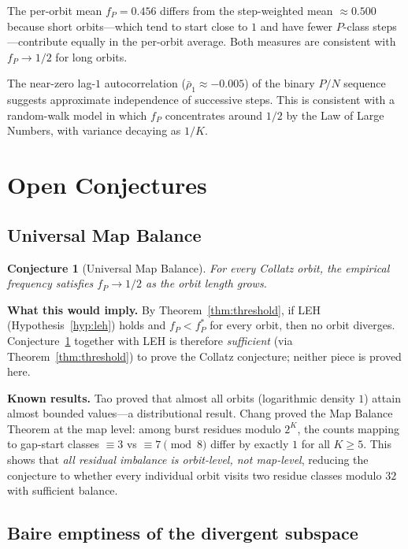 \documentclass[12pt,reqno]{amsart}
\theoremstyle{plain}
\newtheorem{conjecture}[theorem]{Conjecture}
\theoremstyle{definition}
\newcommand{\fP}{f_P}
\newcommand{\fPstar}{f_P^*}
\begin{document}
The per-orbit mean $\fP = 0.456$ differs from the step-weighted mean
$\approx 0.500$ because short orbits---which tend to start close to $1$ and
have fewer $P$-class steps---contribute equally in the per-orbit average.
Both measures are consistent with $\fP \to 1/2$ for long orbits.

The near-zero lag-$1$ autocorrelation ($\bar{\rho}_1 \approx -0.005$) of the
binary $P/N$ sequence suggests approximate independence of successive steps.
This is consistent with a random-walk model in which $\fP$ concentrates
around $1/2$ by the Law of Large Numbers, with variance decaying as $1/K$.

\section{Open Conjectures}\label{sec:conjectures}

\subsection{Universal Map Balance}

\begin{conjecture}[Universal Map Balance]\label{conj:balance}
For every Collatz orbit, the empirical frequency satisfies $\fP \to 1/2$
as the orbit length grows.
\end{conjecture}

\textbf{What this would imply.} By Theorem~\ref{thm:threshold}, if LEH
(Hypothesis~\ref{hyp:leh}) holds and $\fP < \fPstar$ for every orbit, then no
orbit diverges. Conjecture~\ref{conj:balance} together with LEH is therefore
\emph{sufficient} (via Theorem~\ref{thm:threshold}) to prove the Collatz
conjecture; neither piece is proved here.

\textbf{Known results.} Tao \cite{tao2019} proved that almost all orbits
(logarithmic density $1$) attain almost bounded values---a distributional result.
Chang \cite{chang2026reduction} proved the Map Balance Theorem at the map level:
among burst residues modulo $2^K$, the counts mapping to gap-start classes
$\equiv 3$ vs $\equiv 7 \pmod{8}$ differ by exactly $1$ for all $K \geq 5$.
This shows that \emph{all residual imbalance is orbit-level, not map-level},
reducing the conjecture to whether every individual orbit visits two residue
classes modulo $32$ with sufficient balance.

\subsection{Baire emptiness of the divergent subspace}
\end{document}
